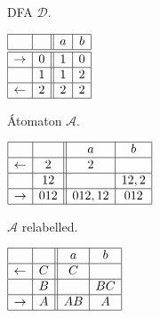 \documentclass[preprint,12pt]{elsarticle}
\newcommand{\cA}{{\mathcal A}}
\newcommand{\cD}{{\mathcal D}}
\begin{document}
\begin{table}[hbt]
\begin{minipage}[b]{0.2\linewidth}
\caption{DFA $\cD$.}
\label{tab:d}
{\footnotesize
\begin{center}
$
\begin{array}{|c|c|| c|c|}    
\hline
 & &   a 
&  b   \\
\hline
\hline
\rightarrow & 0 & 1
& 0  \\
\hline  
 & 1 & 
1 &    2  \\
\hline  
\leftarrow &  2 &  2 
&  2 \\
\hline  
\end{array}
$
\end{center}}
\end{minipage}
\hspace{1cm}
\begin{minipage}[b]{0.32\linewidth}
\caption{\'Atomaton $\cA$.}
\label{tab:a}
{\footnotesize
\begin{center}
$
\begin{array}{|c| c||c| c| }    
\hline
&
&a  & b    \\
\hline  
\leftarrow & 2
& 2 &  \\
\hline  
 & 12
&   & 12,2  \\
\hline  
\rightarrow &  012 
&  012,12  &  012   \\
\hline  
\end{array}
$
\end{center}}
\end{minipage}
\hspace{0.35cm}
\begin{minipage}[b]{0.35\linewidth}
\caption{$\cA$ relabelled.}
\label{tab:a_relabel}
{\footnotesize
\begin{center}
$
\begin{array}{|c| c||c| c| }    
\hline
& 
& a & b   \\
\hline  
\leftarrow & C
& C &  \\
\hline  
 & B
&   &   BC  \\
\hline  
\rightarrow &  A 
&  AB  &  A   \\
\hline  
\end{array}
$
\end{center}}
\end{minipage}
\end{table}
\end{document}
